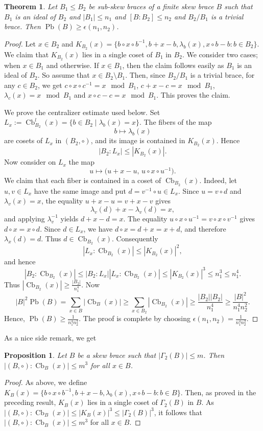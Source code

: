 \documentclass[11pt, oneside]{amsart}
\numberwithin{equation}{section}
\theoremstyle{plain}
\newtheorem{pro}[equation]{Proposition}
\newtheorem{thm}[equation]{Theorem}
\theoremstyle{definition}
\newcommand{\Cb}{\operatorname{Cb} }
\newcommand{\Pb}{\operatorname{Pb} }
\begin{document}
\begin{thm}
     Let $B_1 \leqslant B_2$ be sub-skew braces of a finite skew brace $B$ such that $B_1$ is an ideal of $B_2$ and $|B_1|\leqslant n_1$ and $[B:B_2]\leqslant n_2$ and $B_2/B_1$ is a trivial brace. Then $\Pb(B)\geqslant \epsilon(n_1,n_2)$.
\end{thm}
\begin{proof}
   Let $x\in B_2$ and $K_{B_2}(x)=\{b\circ x \circ b^{-1},b+ x - b,\lambda_b(x),x\circ b-b:b\in B_2\}$. We claim that $K_{B_2}(x)$ lies in a single coset of $B_1$ in $B_2$. We consider two cases; when $x \in B_1$ and otherwise. If $x \in B_1$, then the claim follows easily as $B_1$ is an ideal of $B_2$. So assume that $x \in B_2 \setminus B_1$. Then, since $B_2/B_1$ is a trivial brace, for any $c \in B_2$, we get
  $c \circ x \circ c^{-1} = x \mod{B_1}$, $c + x - c = x \mod{B_1}$, $\lambda_c(x) = x \mod{B_1}$ and $x \circ c - c = x \mod{B_1}$.
This proves the claim.
  
We prove the centralizer estimate used below. Set $L_x:=\Cb_{B_2}^l(x) = \{b \in B_2 \mid \lambda_b(x) = x\}$. The fibers of the map
\[
 b\longmapsto \lambda_b(x)
\]
are cosets of $L_x$ in $(B_2,\circ)$, and its image is contained in $K_{B_2}(x)$. Hence
\[
|B_2:L_x| \leqslant |K_{B_2}(x)|.
\]
Now consider on $L_x$ the map
\[
u\longmapsto\big(u+x-u,\,u\circ x\circ u^{-1}\big).
\]
We claim that each fiber is contained in a coset of $\Cb_{B_2}(x)$. Indeed, let $u,v\in L_x$ have the same image and put $d=v^{-1}\circ u\in L_x$. Since $u=v\circ d$ and $\lambda_v(x)=x$, the equality $u+x-u=v+x-v$ gives
\[
\lambda_v(d)+x-\lambda_v(d)=x,
\]
and applying $\lambda_v^{-1}$ yields $d+x-d=x$. The equality
$u\circ x\circ u^{-1}=v\circ x\circ v^{-1}$ gives
$d\circ x=x\circ d$. Since $d\in L_x$, we have $d\circ x=d+x=x+d$, and therefore $\lambda_x(d)=d$. Thus $d\in\Cb_{B_2}(x)$. Consequently
\[
|L_x:\Cb_{B_2}(x)|\leqslant |K_{B_2}(x)|^2,
\]
and hence
\[
|B_2:\Cb_{B_2}(x)| \leqslant |B_2:L_x| |L_x:\Cb_{B_2}(x)| \leqslant |K_{B_2}(x)|^3\leqslant n_1^3\leqslant n_1^4.
\]
Thus $|\Cb_{B_2}(x)|\geqslant \frac{|B_2|}{n_1^4}$. Now
   $$|B|^2\Pb(B) = \sum_{x\in B}|\Cb_{B}(x)| \geqslant \sum_{x\in B_2}|\Cb_{B_2}(x)|
      \geqslant \frac{|B_2||B_2|}{n_1^4} \geqslant \frac{|B|^2}{n_1^4n_2^2}.
   $$
   Hence, $\Pb(B)\geqslant \frac{1}{n_1^4n_2^2}$. The proof is complete by choosing $\epsilon(n_1,n_2)=\frac{1}{n_1^4n_2^2}$.
\end{proof}


As a nice side remark, we get
\begin{pro}
    Let $B$ be a skew brace such that $|\Gamma_2(B)|\leqslant m $. Then $|(B,\circ):\Cb_B(x)| \leqslant m^3$ for all $x\in B$.
\end{pro}
\begin{proof}
  As above, we define  $K_{B}(x) =\{b\circ x \circ b^{-1},b+ x - b,\lambda_b(x),x\circ b-b:b\in B\}$. Then, as proved in the preceding result,  $K_{B}(x)$ lies in a single coset of $\Gamma_2(B)$ in $B$. As $|(B,\circ):\Cb_B(x)| \leqslant |K_{B}(x)|^3\leqslant|\Gamma_2(B)|^3$, it follows that $|(B,\circ):\Cb_B(x)| \leqslant m^3$ for all $x\in B$. 
\end{proof}
\end{document}
